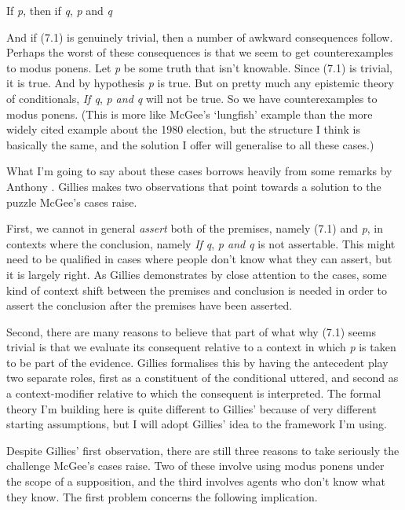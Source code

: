 \renewcommand{\labelenumi}{(7.\arabic{enumi})}
\begin{enumerate*}
\setcounter{enumi}{0}
\item If \textit{p}, then if \textit{q}, \textit{p} and \textit{q}
\end{enumerate*}

\noindent And if (7.1) is genuinely trivial, then a number of awkward consequences follow. Perhaps the worst of these consequences is that we seem to get counterexamples to modus ponens. Let \textit{p} be some truth that isn't knowable. Since (7.1) is trivial, it is true. And by hypothesis \textit{p} is true. But on pretty much any epistemic theory of conditionals, \textit{If q}, \textit{p and q} will not be true. So we have counterexamples to modus ponens. (This is more like McGee's `lungfish' example than the more widely cited example about the 1980 election, but the structure I think is basically the same, and the solution I offer will generalise to all these cases.)

What I'm going to say about these cases borrows heavily from some remarks by Anthony \cite{Gillies2009-GILOTF}. Gillies makes two observations that point towards a solution to the puzzle McGee's cases raise. 

First, we cannot in general \textit{assert} both of the premises, namely (7.1) and \textit{p}, in contexts where the conclusion, namely \textit{If q}, \textit{p and q} is not assertable. This might need to be qualified in cases where people don't know what they can assert, but it is largely right. As Gillies demonstrates by close attention to the cases, some kind of context shift between the premises and conclusion is needed in order to assert the conclusion after the premises have been asserted.

Second, there are many reasons to believe that part of what why (7.1) seems trivial is that we evaluate its consequent relative to a context in which \textit{p} is taken to be part of the evidence. Gillies formalises this by having the antecedent play two separate roles, first as a constituent of the conditional uttered, and second as a context-modifier relative to which the consequent is interpreted. The formal theory I'm building here is quite different to Gillies' because of very different starting assumptions, but I will adopt Gillies' idea to the framework I'm using.

Despite Gillies' first observation, there are still three reasons to take seriously the challenge McGee's cases raise. Two of these involve using modus ponens under the scope of a supposition, and the third involves agents who don't know what they know. The first problem concerns the following implication.

